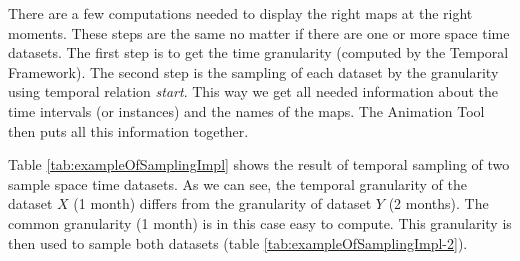 \documentclass[a4paper,12pt,oneside]{book}
\newcommand{\tf}{Temporal Framework\xspace}
\newcommand{\at}{Animation Tool\xspace}
\begin{document}
There are a few computations needed to display the right maps at the right moments.
These steps are the same no matter if there are one or more space time datasets.
The first step is to get the time granularity (computed by the \tf).  
The second step is the sampling of each dataset by the granularity using temporal relation \emph{start}.
This way we get all needed information about the time intervals (or instances) and the names of the maps.
The \at then puts all this information together.

Table \ref{tab:exampleOfSamplingImpl} shows the result of temporal sampling of two sample space time datasets.
As we can see, the temporal granularity of the dataset $X$ (1 month) differs from the granularity of dataset $Y$ (2 months).
The common granularity (1 month) is in this case easy to compute.
This granularity is then used to sample both datasets (table \ref{tab:exampleOfSamplingImpl-2}).
\end{document}
